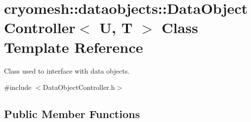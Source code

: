 \hypertarget{classcryomesh_1_1dataobjects_1_1DataObjectController}{\section{cryomesh\-:\-:dataobjects\-:\-:\-Data\-Object\-Controller$<$ \-U, \-T $>$ \-Class \-Template \-Reference}
\label{classcryomesh_1_1dataobjects_1_1DataObjectController}
}


\-Class used to interface with data objects.  




{\ttfamily \#include $<$\-Data\-Object\-Controller.\-h$>$}

\subsection*{\-Public \-Member \-Functions}
